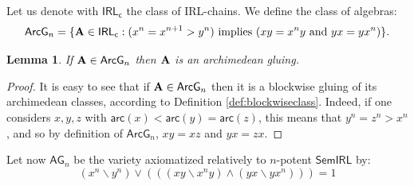 \documentclass{amsart}
\newtheorem{lemma}[theorem]{Lemma}
\theoremstyle{definition}
\numberwithin{equation}{section}
\newcommand{\join}{\vee}
\newcommand{\meet}{\wedge}
\newcommand{\alg}[1]{{\textbf{\upshape #1}}}  %
\newcommand{\vv}[1]{\mathsf {#1}}
\newcommand{\arc}[1]{{\vv{arc}}(#1)}
\newcommand{\BlockG}{\vv{ArcG}}
\newcommand{\BG}{\vv{AG}}
\begin{document}
Let us denote with $\vv{IRL_c}$ the class of IRL-chains. We define the class of algebras:
$$
\BlockG_{n}=\{\alg A \in \vv{IRL_c} : (x^n=x^{n+1} > y^n) \mbox{ implies } (xy=x^ny \mbox{ and } yx=yx^n) \}.
$$
\begin{lemma}\label{lemma: blockwise gluing of archim comp}
	If $\alg A \in \BlockG_{n}$ then $\alg A$ is an archimedean gluing. 
\end{lemma}
\begin{proof}
It is easy to see that if $\alg A \in \BlockG_{n}$ then it is a blockwise gluing of its archimedean classes, according to Definition \ref{def:blockwiseclass}. Indeed, if one considers $x, y, z$ with $\arc x < \arc y = \arc z$, this means that $y^n=z^n > x^n$, and so by definition of $\BlockG_{n}$, $xy=xz$ and $yx=zx$.
\end{proof}
 Let now $\BG_{n}$ be the variety axiomatized relatively to $n$-potent $\vv{SemIRL}$ by: 
\begin{equation*} \label{eq: equation Bn}
  	(x^n \backslash y^n) \join (((xy\backslash x^ny)\meet (yx \backslash yx^n)))=1
  	\tag{block$_n$}
 \end{equation*} 
 
\end{document}
